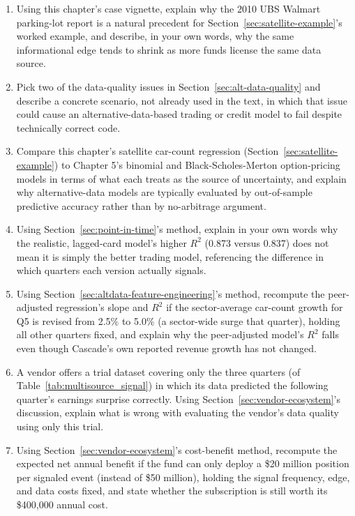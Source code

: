 \documentclass[../ai_in_finance]{subfiles}
\begin{document}
\begin{enumerate}
    \item Using this chapter's case vignette, explain why the 2010 UBS Walmart parking-lot report is a natural precedent for Section~\ref{sec:satellite-example}'s worked example, and describe, in your own words, why the same informational edge tends to shrink as more funds license the same data source.
    \item Pick two of the data-quality issues in Section~\ref{sec:alt-data-quality} and describe a concrete scenario, not already used in the text, in which that issue could cause an alternative-data-based trading or credit model to fail despite technically correct code.
    \item Compare this chapter's satellite car-count regression (Section~\ref{sec:satellite-example}) to Chapter 5's binomial and Black-Scholes-Merton option-pricing models in terms of what each treats as the source of uncertainty, and explain why alternative-data models are typically evaluated by out-of-sample predictive accuracy rather than by no-arbitrage argument.
    \item Using Section~\ref{sec:point-in-time}'s method, explain in your own words why the realistic, lagged-card model's higher $R^2$ (0.873 versus 0.837) does not mean it is simply the better trading model, referencing the difference in which quarters each version actually signals.
    \item Using Section~\ref{sec:altdata-feature-engineering}'s method, recompute the peer-adjusted regression's slope and $R^2$ if the sector-average car-count growth for Q5 is revised from 2.5\% to 5.0\% (a sector-wide surge that quarter), holding all other quarters fixed, and explain why the peer-adjusted model's $R^2$ falls even though Cascade's own reported revenue growth has not changed.
    \item A vendor offers a trial dataset covering only the three quarters (of Table~\ref{tab:multisource_signal}) in which its data predicted the following quarter's earnings surprise correctly. Using Section~\ref{sec:vendor-ecosystem}'s discussion, explain what is wrong with evaluating the vendor's data quality using only this trial.
    \item Using Section~\ref{sec:vendor-ecosystem}'s cost-benefit method, recompute the expected net annual benefit if the fund can only deploy a \$20 million position per signaled event (instead of \$50 million), holding the signal frequency, edge, and data costs fixed, and state whether the subscription is still worth its \$400,000 annual cost.

\end{enumerate}
\end{document}
